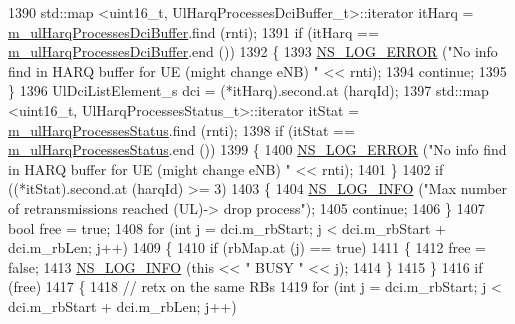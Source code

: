 \begin{DoxyCode}
1390               std::map <uint16\_t, UlHarqProcessesDciBuffer\_t>::iterator itHarq = 
      \hyperlink{classns3_1_1TdBetFfMacScheduler_a24641ddb697d45df50ee7bcaaacdb1e1}{m\_ulHarqProcessesDciBuffer}.find (rnti);
1391               \textcolor{keywordflow}{if} (itHarq == \hyperlink{classns3_1_1TdBetFfMacScheduler_a24641ddb697d45df50ee7bcaaacdb1e1}{m\_ulHarqProcessesDciBuffer}.end ())
1392                 \{
1393                   \hyperlink{group__logging_ga0261a8db1d4ac5f79417d117634fd455}{NS\_LOG\_ERROR} (\textcolor{stringliteral}{"No info find in HARQ buffer for UE (might change eNB) "} << 
      rnti);
1394                   \textcolor{keywordflow}{continue};
1395                 \}
1396               UlDciListElement\_s dci = (*itHarq).second.at (harqId);
1397               std::map <uint16\_t, UlHarqProcessesStatus\_t>::iterator itStat = 
      \hyperlink{classns3_1_1TdBetFfMacScheduler_a41bae8c97c560b2a314650d7e99bd356}{m\_ulHarqProcessesStatus}.find (rnti);
1398               \textcolor{keywordflow}{if} (itStat == \hyperlink{classns3_1_1TdBetFfMacScheduler_a41bae8c97c560b2a314650d7e99bd356}{m\_ulHarqProcessesStatus}.end ())
1399                 \{
1400                   \hyperlink{group__logging_ga0261a8db1d4ac5f79417d117634fd455}{NS\_LOG\_ERROR} (\textcolor{stringliteral}{"No info find in HARQ buffer for UE (might change eNB) "} << 
      rnti);
1401                 \}
1402               \textcolor{keywordflow}{if} ((*itStat).second.at (harqId) >= 3)
1403                 \{
1404                   \hyperlink{group__logging_gafbd73ee2cf9f26b319f49086d8e860fb}{NS\_LOG\_INFO} (\textcolor{stringliteral}{"Max number of retransmissions reached (UL)-> drop process"});
1405                   \textcolor{keywordflow}{continue};
1406                 \}
1407               \textcolor{keywordtype}{bool} free = \textcolor{keyword}{true};
1408               \textcolor{keywordflow}{for} (\textcolor{keywordtype}{int} j = dci.m\_rbStart; j < dci.m\_rbStart + dci.m\_rbLen; j++)
1409                 \{
1410                   \textcolor{keywordflow}{if} (rbMap.at (j) == \textcolor{keyword}{true})
1411                     \{
1412                       free = \textcolor{keyword}{false};
1413                       \hyperlink{group__logging_gafbd73ee2cf9f26b319f49086d8e860fb}{NS\_LOG\_INFO} (\textcolor{keyword}{this} << \textcolor{stringliteral}{" BUSY "} << j);
1414                     \}
1415                 \}
1416               \textcolor{keywordflow}{if} (free)
1417                 \{
1418                   \textcolor{comment}{// retx on the same RBs}
1419                   \textcolor{keywordflow}{for} (\textcolor{keywordtype}{int} j = dci.m\_rbStart; j < dci.m\_rbStart + dci.m\_rbLen; j++)

\end{DoxyCode}
